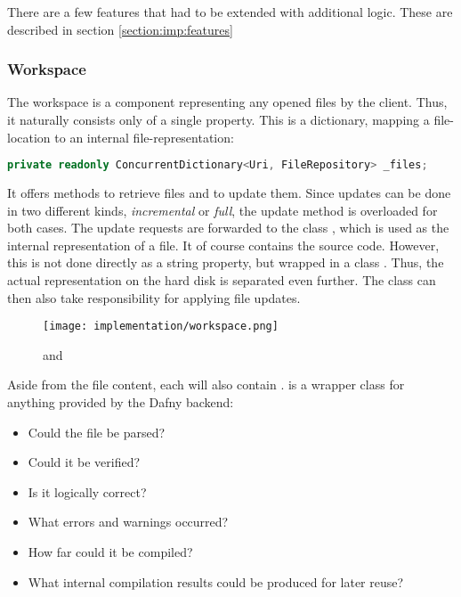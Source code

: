 There are a few features that had to be extended with additional logic.
These are described in section \ref{section:imp:features}

\subsubsection{Workspace}
The workspace is a component representing any opened files by the client.
Thus, it naturally consists only of a single property.
This is a dictionary, mapping a file-location to an internal file-representation:

\begin{lstlisting}[language=csharp, caption={Workspace Property}, captionpos=b, label={lst:workspaceproperty}]
private readonly ConcurrentDictionary<Uri, FileRepository> _files;
\end{lstlisting}

It offers methods to retrieve files and to update them.
Since updates can be done in two different kinds, \textit{incremental} or \textit{full}, the update method is overloaded for both cases.
The update requests are forwarded to the class , which is used as the internal representation of a file.
It of course contains the source code.
However, this is not done directly as a string property, but wrapped in a class .
Thus, the actual representation on the hard disk is separated even further.
The  class can then also take responsibility for applying file updates.\\

\begin{figure}[H]
    \centering
    \texttt{[image: implementation/workspace.png]}
    \caption{ and }
    \label{fig:worksapceAndRepo}
\end{figure}

Aside from the file content, each  will also contain . \linebreak
{} is a wrapper class for anything provided by the Dafny backend:
\begin{itemize}
    \item Could the file be parsed?
    \item Could it be verified?
    \item Is it logically correct?
    \item What errors and warnings occurred?
    \item How far could it be compiled?
    \item What internal compilation results could be produced for later reuse?
\end{itemize}

